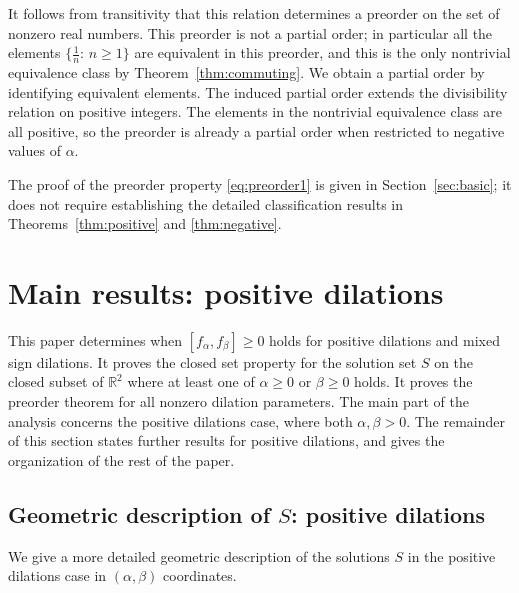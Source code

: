 \documentclass[11pt, letterpaper, reqno]{amsart}
\theoremstyle{definition}
\numberwithin{equation}{section}
\newcommand{\RR}{\ensuremath{\mathbb{R}}}
\begin{document}
It follows from transitivity that this relation determines 
a preorder on the set of nonzero real numbers.
This preorder is not a partial order; 
in particular all the elements
$\{ \frac{1}{n}: \, n \ge 1\}$ are equivalent in  this preorder,
and this is the only nontrivial equivalence class by Theorem~\ref{thm:commuting}. 
We obtain a partial order by identifying  equivalent elements.
The induced partial order  extends the divisibility relation on positive integers.
The elements in the nontrivial equivalence class are all positive, 
so the preorder is already a  partial order when restricted to negative values of $\alpha$. 


The proof of the preorder property \eqref{eq:preorder1}
is given in Section~\ref{sec:basic};
it does not require establishing the detailed classification results in
Theorems~\ref{thm:positive} and \ref{thm:negative}.


%
%
%
\section{Main results: positive dilations}
\label{sec:2}
\setcounter{equation}{0}

This paper determines when $[f_\alpha,f_\beta]\geq 0$ holds for positive dilations and mixed sign dilations.
It proves the closed set property for the solution set $S$ on the closed subset of $\RR^2$ where at
least one of $\alpha \ge 0$ or $\beta\ge 0$ holds. 
It proves the preorder theorem for all nonzero dilation parameters. 
The main part of the analysis concerns the positive dilations case,
where  both $\alpha, \beta>0$.
The remainder of this section states further  results for positive dilations,
and gives the organization of the rest of the paper.

%
%

\subsection{Geometric description of $S$: positive dilations} 
\label{subsec:21}

We give a more detailed geometric description of the solutions $S$ in
the positive  dilations case in $(\alpha, \beta)$ coordinates.
\end{document}
